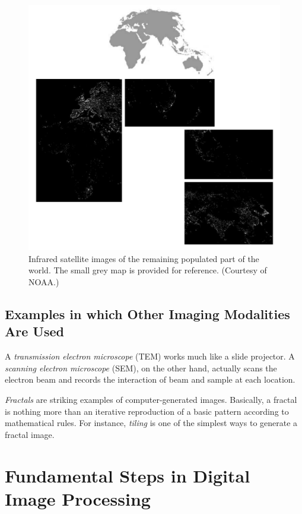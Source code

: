 \documentclass[12pt,a4paper,twoside,openany]{book}
\begin{document}
\begin{figure}[htbp]
    \centering
    \includegraphics[width=\linewidth]{Figure1 13.jpeg}
    \caption{Infrared satellite images of the remaining populated part of the world. The small grey map is provided for reference. (Courtesy of NOAA.)}
    \label{Figure:1.13}
\end{figure}

\subsection{Examples in which Other Imaging Modalities Are Used}

A \textit{transmission electron microscope} (TEM) works much like a slide projector. A \textit{scanning electron microscope} (SEM), on the other hand, actually scans the electron beam and records the interaction of beam and sample at each location.

\textit{Fractals} are striking examples of computer-generated images. Basically, a fractal is nothing more than an iterative reproduction of a basic pattern according to mathematical rules. For instance, \textit{tiling} is one of the simplest ways to generate a fractal image.

\section{Fundamental Steps in Digital Image Processing}

\end{document}
